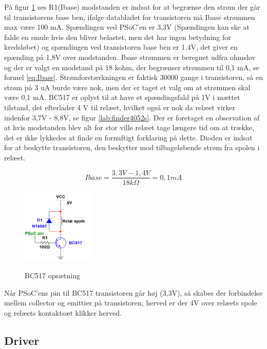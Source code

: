 På figur \ref{lab:BC517} ses R1(Ibase) modstanden er indsat for at begrænse den strøm der går til transistorens base ben, ifølge databladet for transistoren må Ibase strømmen max være 100 mA. Spændingen ved PSoC'en er 3,3V (Spændingen kan ske at falde en smule hvis den bliver belastet, men det har ingen betydning for kredsløbet) og spændingen ved transistoren base ben er 1,4V, det giver en spænding på 1,8V over modstanden. Ibase strømmen er beregnet udfra ohmslov og der er valgt en modstand på 18 kohm, der begrænser strømmen til 0,1 mA, se formel \ref{eq:Ibase}.
\newline \newline
Strømforstærkningen er faktisk 30000 gange i transistoren, så en strøm på 3 uA burde være nok, men der er taget et valg om at strømmen skal være 0,1 mA. BC517 er oplyst til at have et spændingsfald på 1V i mættet tilstand, det efterlader 4 V til relæet, hvilket også er nok da relæet virker indenfor 3,7V - 8,8V, se figur \ref{lab:finder4052s}. Der er foretaget en observation af at hvis modstanden blev alt for stor ville relæet tage længere tid om at trække, det er ikke lykkedes at finde en fornuftigt forklaring på dette. Dioden er indsat for at beskytte transistoren, den beskytter mod tilbageløbende strøm fra spolen i relæet.

\begin{equation} 
Ibase = \frac{3,3V - 1,4V}{18k\Omega} = 0,1mA
\label{eq:Ibase}
\end{equation}

\begin{figure}[H] \centering
{\includegraphics[width=0.3\textwidth]{filer/design/Billeder/BC517}}
\caption{BC517 opsætning}
\label{lab:BC517}
\raggedright
\end{figure} 

Når PSoC'ens pin til BC517 transistoren går høj (3,3V), så skabes der forbindelse mellem collector og emittier på transistoren, herved er der 4V over relæets spole og relæets kontaktsæt klikker herved. 

\subsection{Driver}

